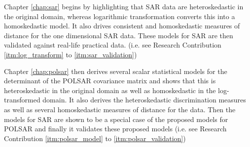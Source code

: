 

                Chapter \ref{chap:sar} begins by highlighting that SAR
                data are heteroskedastic in the original domain, whereas
                logarithmic transformation converts this into a
                homoskedastic model. 
It
                also drives consistent and homoskedastic measures of
                distance for the one dimensional SAR data.
These
                models for SAR are then validated against real-life
                practical data. (i.e. see Research Contribution \ref{itm:log_transform} to \ref{itm:sar_validation})

 Chapter
                \ref{chap:polsar} then derives several scalar statistical models for the
                determinant of the POLSAR covariance matrix and
                shows that this is heteroskedastic in the original
                domain as well as homoskedastic in the log-transformed
                domain.
It
                also derives the heteroskedastic discrimination measures
                 as well as several homoskedastic measures of
                distance for the data.
Then
                the models for SAR are shown to be a special case of
                the proposed models for POLSAR and finally it
                validates these proposed models (i.e. see Research Contribution \ref{itm:polsar_model} to \ref{itm:polsar_validation})

